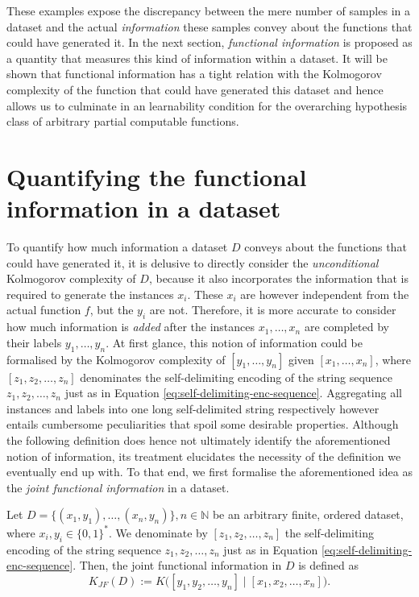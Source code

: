 These examples expose the discrepancy between the mere number of samples in a dataset and the actual \textit{information} these samples convey about the functions that could have generated it.
In the next section, \textit{functional information} is proposed as a quantity that measures this kind of information within a dataset.
It will be shown that functional information has a tight relation with the Kolmogorov complexity of the function that could have generated this dataset and hence allows us to culminate in an learnability condition for the overarching hypothesis class of arbitrary partial computable functions.

\section{Quantifying the functional information in a dataset}
\label{sec:quantify-functional-information}
To quantify how much information a dataset $D$ conveys about the functions that could have generated it, it is delusive to directly consider the \textit{unconditional} Kolmogorov complexity of $D$, because it also incorporates the information that is required to generate the instances $x_i$.
These $x_i$ are however independent from the actual function $f$, but the $y_i$ are not. Therefore, it is more accurate to consider how much information is \textit{added} after the instances $x_1,\dots,x_n$ are completed by their labels $y_1,\dots,y_n$.
At first glance, this notion of information could be formalised by the Kolmogorov complexity of $[y_1,\dots,y_n]$ given $[x_1,\dots,x_n]$, where $[z_1,z_2,\dots,z_n]$ denominates the self-delimiting encoding of the string sequence $z_1,z_2,\dots,z_n$ just as in Equation \ref{eq:self-delimiting-enc-sequence}.
Aggregating all instances and labels into one long self-delimited string respectively however entails cumbersome peculiarities that spoil some desirable properties.
Although the following definition does hence not ultimately identify the aforementioned notion of information, its treatment elucidates the necessity of the definition we eventually end up with.
To that end, we first formalise the aforementioned idea as the \textit{joint functional information} in a dataset.
\begin{definition}
	Let $D=\{(x_1,y_1),\dots,(x_n,y_n)\},n\in\mathbb{N}$ be an arbitrary finite, ordered dataset, where $x_i,y_i\in\{0,1\}^{*}$.
	We denominate by $[z_1,z_2,\dots,z_n]$ the self-delimiting encoding of the string sequence $z_1,z_2,\dots,z_n$ just as in Equation \ref{eq:self-delimiting-enc-sequence}.
	Then, the joint functional information in $D$ is defined as
	\begin{equation}
		K_{JF}(D):=K\bigl([y_1,y_2,\dots,y_n] \mid [x_1,x_2,\dots,x_n]\bigr).
	\end{equation}
	
\end{definition}
